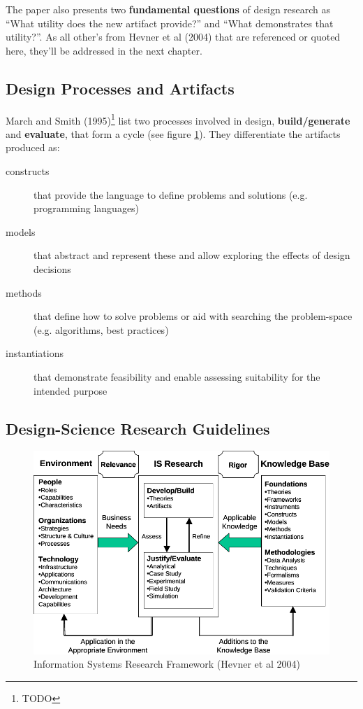 The paper also presents two \textbf{fundamental questions} of design research as ``What utility does the new artifact provide?'' and ``What demonstrates that utility?''. As all other's from Hevner et al (2004) that are referenced or quoted here, they'll be addressed in the next chapter. %

\subsection{Design Processes and Artifacts}


March and Smith (1995)\footnote{TODO} list two processes involved in design, \textbf{build/generate} and \textbf{evaluate}, that form a cycle (see figure \ref{fig:hevner}). They differentiate the artifacts produced as:

\begin{description}
 \item[constructs] that provide the language to define problems and solutions (e.g. programming languages)
 \item[models] that abstract and represent these and allow exploring the effects of design decisions
 \item[methods] that define how to solve problems or aid with searching the problem-space (e.g. algorithms, best practices)
 \item[instantiations] that demonstrate feasibility and enable assessing suitability for the intended purpose
\end{description}

\subsection{Design-Science Research Guidelines}

\begin{figure}
\centering
\includegraphics[width=1.0\textwidth]{figures/Hevner-et-al-2004-figure-2.pdf}
\caption{\label{fig:hevner}Information Systems Research Framework (Hevner et al 2004)}
\end{figure}

